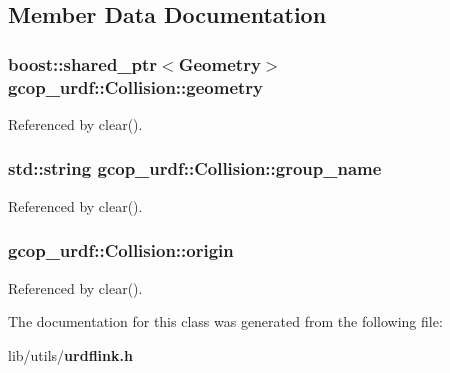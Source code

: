 \subsection{\-Member \-Data \-Documentation}
\subsubsection[{geometry}]{\setlength{\rightskip}{0pt plus 5cm}boost\-::shared\-\_\-ptr$<${\bf \-Geometry}$>$ {\bf gcop\-\_\-urdf\-::\-Collision\-::geometry}}\label{classgcop__urdf_1_1Collision_a4ee63373bb6dfdcd07f1f40ccd9c6912}


\-Referenced by clear().

\subsubsection[{group\-\_\-name}]{\setlength{\rightskip}{0pt plus 5cm}std\-::string {\bf gcop\-\_\-urdf\-::\-Collision\-::group\-\_\-name}}\label{classgcop__urdf_1_1Collision_add40b5ff122e639c4136a783815b41f5}


\-Referenced by clear().

\subsubsection[{origin}]{ {\bf gcop\-\_\-urdf\-::\-Collision\-::origin}}\label{classgcop__urdf_1_1Collision_ab3f8e298a1505f91eabc06e4a7293509}


\-Referenced by clear().



\-The documentation for this class was generated from the following file\-:\begin{DoxyCompactItemize}
\item 
lib/utils/{\bf urdflink.\-h}\end{DoxyCompactItemize}
